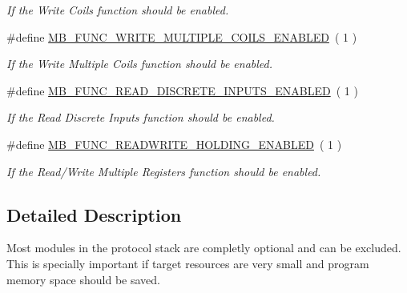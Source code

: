 \begin{DoxyCompactItemize}
\begin{DoxyCompactList}\small\item\em If the {\itshape Write Coils} function should be enabled. \end{DoxyCompactList}\item 
\#define \hyperlink{group__modbus__cfg_ga1973cf9a66e8738ee06681443259b78f}{M\+B\+\_\+\+F\+U\+N\+C\+\_\+\+W\+R\+I\+T\+E\+\_\+\+M\+U\+L\+T\+I\+P\+L\+E\+\_\+\+C\+O\+I\+L\+S\+\_\+\+E\+N\+A\+B\+L\+ED}~(  1 )\hypertarget{group__modbus__cfg_ga1973cf9a66e8738ee06681443259b78f}{}\label{group__modbus__cfg_ga1973cf9a66e8738ee06681443259b78f}

\begin{DoxyCompactList}\small\item\em If the {\itshape Write Multiple Coils} function should be enabled. \end{DoxyCompactList}\item 
\#define \hyperlink{group__modbus__cfg_ga76bb577b6d66b4e45571f7e46b04b134}{M\+B\+\_\+\+F\+U\+N\+C\+\_\+\+R\+E\+A\+D\+\_\+\+D\+I\+S\+C\+R\+E\+T\+E\+\_\+\+I\+N\+P\+U\+T\+S\+\_\+\+E\+N\+A\+B\+L\+ED}~(  1 )\hypertarget{group__modbus__cfg_ga76bb577b6d66b4e45571f7e46b04b134}{}\label{group__modbus__cfg_ga76bb577b6d66b4e45571f7e46b04b134}

\begin{DoxyCompactList}\small\item\em If the {\itshape Read Discrete Inputs} function should be enabled. \end{DoxyCompactList}\item 
\#define \hyperlink{group__modbus__cfg_gae62a61cbd68a80de8c7ee268a5934ea3}{M\+B\+\_\+\+F\+U\+N\+C\+\_\+\+R\+E\+A\+D\+W\+R\+I\+T\+E\+\_\+\+H\+O\+L\+D\+I\+N\+G\+\_\+\+E\+N\+A\+B\+L\+ED}~(  1 )\hypertarget{group__modbus__cfg_gae62a61cbd68a80de8c7ee268a5934ea3}{}\label{group__modbus__cfg_gae62a61cbd68a80de8c7ee268a5934ea3}

\begin{DoxyCompactList}\small\item\em If the {\itshape Read/\+Write Multiple Registers} function should be enabled. \end{DoxyCompactList}\end{DoxyCompactItemize}


\subsection{Detailed Description}
Most modules in the protocol stack are completly optional and can be excluded. This is specially important if target resources are very small and program memory space should be saved.~\newline


